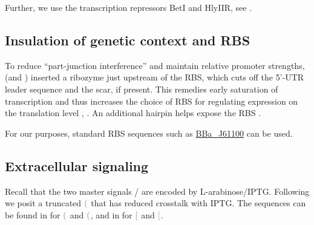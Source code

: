 \documentclass[12pt,notitlepage]{article}
\let\cite\citep
\newcommand{\cbra}[1]{{\ensuremath{\color{gray}{#1}}}}
\newcommand{\protein}[1]{{{\cbra{(}\ce{#1}\cbra{)}}}}
\newcommand{\promoter}[1]{{{\cbra{[}\ce{#1}\cbra{]}}}}
\newcommand{\ra}[1]{{\color{Blue}#1}}
\begin{document}


\ra{
Further, we use the transcription repressors BetI and HlyIIR,
see \cite{NielsenETAL2016}.
}





\subsection{Insulation of genetic context and RBS}


To reduce ``part-junction interference''
and maintain relative promoter strengths,
\citet{LouETAL2012}
(and \citet{NielsenETAL2016})
inserted a ribozyme
just upstream of the RBS,
which cuts off the 5'-UTR leader sequence and the scar,
if present.
%
%
This remedies early saturation 
of {transcription}
\cite[SM:Fig.~5]{LouETAL2012}
and
thus increases the choice of RBS for 
regulating expression on 
the {translation} level
\cite[SM:Fig.~4]{LouETAL2012}, \cite{Salis2011}.
%
An additional hairpin helps expose the RBS
\cite{LouETAL2012, CarrierKeasling1997}.

%
%

For our purposes,
standard RBS sequences 
such as 
\href{http://parts.igem.org/wiki/index.php/Part:BBa_J61100}{BBa\_J61100}
can be used.



\subsection{Extracellular signaling} \label{ss:wAB}

Recall that
the two master signals /
are encoded by L-arabinose/IPTG.
%
%
Following \citet[SM, VII.M]{NielsenETAL2016}
we posit
a truncated \protein{AraC^*}
that has reduced crosstalk with IPTG.
%
%
%
The sequences can be found 
in
\cite[SM, Table~S8]{NielsenETAL2016}
for \protein{Ara^*} and \protein{LacI},
and
in
\cite[SM, Table~S9]{NielsenETAL2016}
for \promoter{BAD} and \promoter{Tac}.

\end{document}
